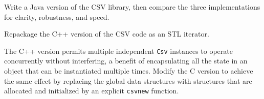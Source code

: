 \begin{exercise}
    Write a Java version of the CSV library, then compare the three
    implementations for clarity, robustness, and speed.
\end{exercise}

\begin{exercise}
    Repackage the C++ version of the CSV code as an STL iterator.
\end{exercise}

\begin{exercise}
    The C++ version permits multiple independent \verb'Csv' instances to
    operate concurrently without interfering, a benefit of encapsulating
    all the state in an object that can be instantiated multiple times.
    Modify the C version to achieve the same effect by replacing the global
    data structures with structures that are allocated and initialized by
    an explicit \verb'csvnew' function.
\end{exercise}
